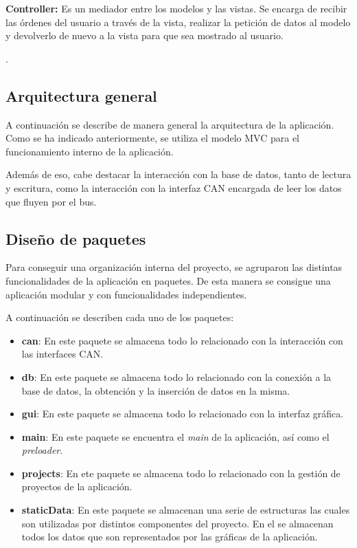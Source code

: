 \textbf{Controller:} Es un mediador entre los modelos y las vistas. Se encarga de recibir las órdenes del usuario a través de la vista, realizar la petición de datos al modelo y devolverlo de nuevo a la vista para que sea mostrado al usuario.

.

\subsection{Arquitectura general}

A continuación se describe de manera general la arquitectura de la aplicación. Como se ha indicado anteriormente, se utiliza el modelo MVC para el funcionamiento interno de la aplicación.

Además de eso, cabe destacar la interacción con la base de datos, tanto de lectura y escritura, como la interacción con la interfaz CAN encargada de leer los datos que fluyen por el bus.


\subsection{Diseño de paquetes}

Para conseguir una organización interna del proyecto, se agruparon las distintas funcionalidades de la aplicación en paquetes. De esta manera se consigue una aplicación modular y con funcionalidades independientes.


A continuación se describen cada uno de los paquetes:

\begin{itemize}
\item
\textbf{can}: En este paquete se almacena todo lo relacionado con la interacción con las interfaces CAN.
\item
\textbf{db}: En este paquete se almacena todo lo relacionado con la conexión a la base de datos, la obtención y la inserción de datos en la misma.
\item
\textbf{gui}: En este paquete se almacena todo lo relacionado con la interfaz gráfica. 
\item
\textbf{main}: En este paquete se encuentra el \emph{main} de la aplicación, así como el \emph{preloader}.
\item
\textbf{projects}: En ete paquete se almacena todo lo relacionado con la gestión de proyectos de la aplicación.
\item
\textbf{staticData}: En este paquete se almacenan una serie de estructuras las cuales son utilizadas por distintos componentes del proyecto. En el se almacenan todos los datos que son representados por las gráficas de la aplicación.
\end{itemize}

